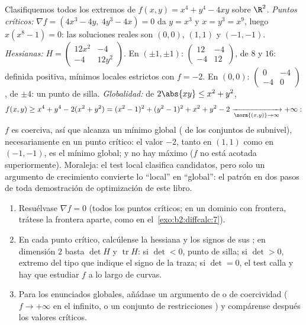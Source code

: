 \begin{example}\label{ex:b2:diffcalc:quarticrun}
Clasifiquemos todos los extremos de $f(x, y) = x^4 + y^4 - 4xy$ sobre
$\R^2$. \emph{Puntos críticos:} $\nabla f = (4x^3 - 4y,\ 4y^3 - 4x) =
0$ da $y = x^3$ y $x = y^3 = x^9$, luego $x(x^8 - 1) = 0$: las
soluciones reales son $(0,0)$, $(1,1)$ y $(-1,-1)$.
\emph{Hessianas:} $H = \begin{pmatrix} 12x^2 & -4\\ -4 &
12y^2\end{pmatrix}$. En $(\pm1, \pm1)$: $\begin{pmatrix} 12 & -4\\ -4
& 12\end{pmatrix}$, de  $8$ y $16$: definida positiva,
mínimos locales estrictos con $f = -2$. En $(0,0)$: $\begin{pmatrix}
0 & -4\\ -4 & 0\end{pmatrix}$, de  $\pm4$: un punto de
silla. \emph{Globalidad:} de $2\abs{xy} \leq x^2 + y^2$,
\[
f(x, y) \geq x^4 + y^4 - 2(x^2 + y^2)
= (x^2 - 1)^2 + (y^2 - 1)^2 + x^2 + y^2 - 2
\xrightarrow[\norm{(x,y)}\to\infty]{} +\infty :
\]
$f$ es coerciva, así que alcanza un mínimo global ( de los
conjuntos de subnivel), necesariamente en un punto crítico: el valor
$-2$, tanto en $(1,1)$ como en $(-1,-1)$, es el mínimo global; y no
hay máximo ($f$ no está acotada superiormente). Moraleja: el test
local clasifica candidatos, pero solo un argumento de crecimiento
convierte lo ``local'' en ``global'': el patrón en dos pasos de toda
demostración de optimización de este libro.
\end{example}

\begin{method}\label{met:b2:diffcalc:extrema}
\begin{enumerate}
  \item Resuélvase $\nabla f = 0$ (todos los puntos críticos; en un
        dominio con frontera, trátese la frontera aparte, como en el~\cref{exo:b2:diffcalc:7}).
  \item En cada punto crítico, calcúlense la hessiana y los signos
        de sus ; en dimensión $2$ basta $\det H$ y
        $\operatorname{tr} H$: si $\det < 0$, punto de silla; si
        $\det > 0$, extremo del tipo que indique el signo de la
        traza; si $\det = 0$, el test calla y hay que estudiar $f$ a
        lo largo de curvas.
  \item Para los enunciados globales, añádase un argumento de
         o de coercividad ($f \to +\infty$ en el infinito, o
        un conjunto de restricciones ) y compárense después
        los valores críticos.
\end{enumerate}
\end{method}

